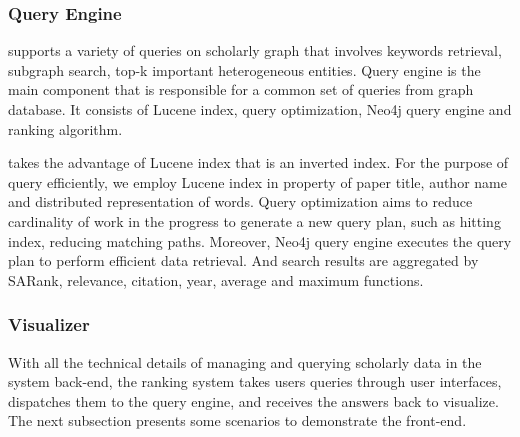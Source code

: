 

\subsubsection{Query Engine}
\oursystem supports a variety of queries on scholarly graph that involves keywords retrieval, subgraph search, top-k important heterogeneous entities. Query engine is the main component that is responsible for a common set of queries from graph database. It consists of Lucene index, query optimization, Neo4j query engine and ranking algorithm.

\par
\oursystem takes the advantage of Lucene index that is an inverted index. For the purpose of query efficiently, we employ Lucene index in property of paper title, author name and distributed representation of words. Query optimization aims to reduce cardinality of work in the progress to generate a new query plan, such as hitting index, reducing matching paths. Moreover, Neo4j query engine executes the query plan to perform efficient data retrieval. And search results are aggregated by SARank, relevance, citation, year, average and maximum functions.

\subsubsection{Visualizer}
With all the technical details of managing and querying scholarly data in the system back-end, the ranking system takes users queries through user interfaces, dispatches them to the query engine, and receives the answers back to visualize. The next subsection presents some scenarios to demonstrate the front-end.

